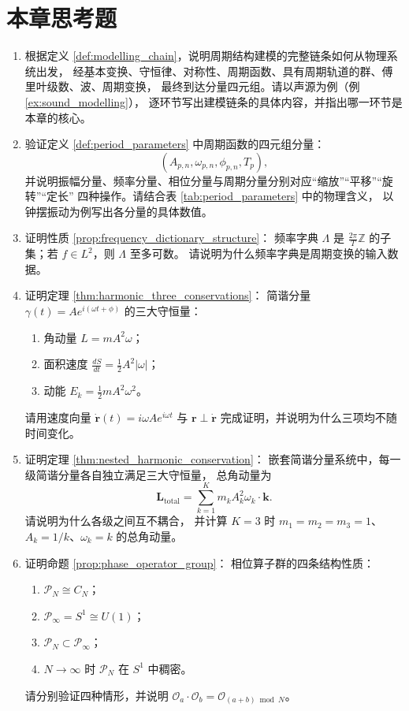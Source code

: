 \section*{本章思考题}

\begin{enumerate}[leftmargin=3em, label=\textbf{题 \arabic*}]
    \item 根据定义 \ref{def:modelling_chain}，说明周期结构建模的完整链条如何从物理系统出发，
    经基本变换、守恒律、对称性、周期函数、具有周期轨道的群、傅里叶级数、波、周期变换，
    最终到达分量四元组。请以声源为例（例 \ref{ex:sound_modelling}），
    逐环节写出建模链条的具体内容，并指出哪一环节是本章的核心。

    \item 验证定义 \ref{def:period_parameters} 中周期函数的四元组分量：
    \[
    (A_{p,n},\omega_{p,n},\phi_{p,n},T_p),
    \]
    并说明振幅分量、频率分量、相位分量与周期分量分别对应“缩放”“平移”“旋转”“定长”
    四种操作。请结合表 \ref{tab:period_parameters} 中的物理含义，
    以钟摆振动为例写出各分量的具体数值。

    \item 证明性质 \ref{prop:frequency_dictionary_structure}：
    频率字典 $\Lambda$ 是 $\frac{2\pi}{T}\mathbb{Z}$ 的子集；若 $f\in L^2$，则 $\Lambda$ 至多可数。
    请说明为什么频率字典是周期变换的输入数据。

    \item 证明定理 \ref{thm:harmonic_three_conservations}：
    简谐分量 $\gamma(t)=Ae^{i(\omega t+\phi)}$ 的三大守恒量：
    \begin{enumerate}[label=(\roman*)]
        \item 角动量 $L=mA^2\omega$；
        \item 面积速度 $\frac{dS}{dt}=\frac12A^2|\omega|$；
        \item 动能 $E_k=\frac12mA^2\omega^2$。
    \end{enumerate}
    请用速度向量 $\dot{\mathbf{r}}(t)=i\omega Ae^{i\omega t}$ 与 $\mathbf{r}\perp\dot{\mathbf{r}}$
    完成证明，并说明为什么三项均不随时间变化。

    \item 证明定理 \ref{thm:nested_harmonic_conservation}：
    嵌套简谐分量系统中，每一级简谐分量各自独立满足三大守恒量，
    总角动量为
    \[
    \mathbf{L}_{\text{total}}=\sum_{k=1}^K m_kA_k^2\omega_k\cdot\mathbf{k}.
    \]
    请说明为什么各级之间互不耦合，
    并计算 $K=3$ 时 $m_1=m_2=m_3=1$、$A_k=1/k$、$\omega_k=k$ 的总角动量。

    \item 证明命题 \ref{prop:phase_operator_group}：
    相位算子群的四条结构性质：
    \begin{enumerate}[label=(\roman*)]
        \item $\mathcal{P}_N\cong C_N$；
        \item $\mathcal{P}_\infty=S^1\cong U(1)$；
        \item $\mathcal{P}_N\subset\mathcal{P}_\infty$；
        \item $N\to\infty$ 时 $\mathcal{P}_N$ 在 $S^1$ 中稠密。
    \end{enumerate}
    请分别验证四种情形，并说明 $\mathcal{O}_a\cdot\mathcal{O}_b=\mathcal{O}_{(a+b)\bmod N}$。


\end{enumerate}

